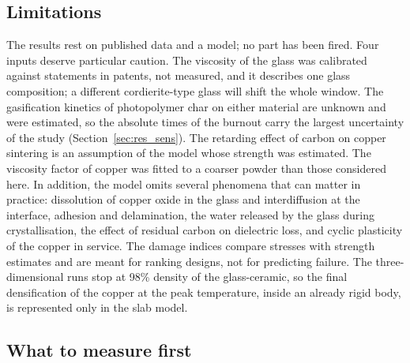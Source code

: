 \subsection{Limitations}

The results rest on published data and a model; no part has been fired. Four inputs deserve particular caution. The viscosity of the glass was calibrated against statements in patents, not measured, and it describes one glass composition; a different cordierite-type glass will shift the whole window. The gasification kinetics of photopolymer char on either material are unknown and were estimated, so the absolute times of the burnout carry the largest uncertainty of the study (Section~\ref{sec:res_sens}). The retarding effect of carbon on copper sintering is an assumption of the model whose strength was estimated. The viscosity factor of copper was fitted to a coarser powder than those considered here. In addition, the model omits several phenomena that can matter in practice: dissolution of copper oxide in the glass and interdiffusion at the interface, adhesion and delamination, the water released by the glass during crystallisation, the effect of residual carbon on dielectric loss, and cyclic plasticity of the copper in service. The damage indices compare stresses with strength estimates and are meant for ranking designs, not for predicting failure. The three-dimensional runs stop at 98\% density of the glass-ceramic, so the final densification of the copper at the peak temperature, inside an already rigid body, is represented only in the slab model.

\subsection{What to measure first}


